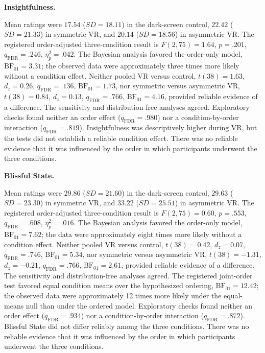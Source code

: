 \documentclass[pdflatex,sn-basic,lineno]{../sn-jnl}
\begin{document}
\medskip\noindent\textbf{Insightfulness.}\nopagebreak[4]

Mean ratings were $17.54$ ($SD=18.11$) in the dark-screen control, $22.42$ ($SD=21.33$) in symmetric VR, and $20.14$ ($SD=18.56$) in asymmetric VR. The registered order-adjusted three-condition result is $F(2,75)=1.64$, $p=.201$, $q_{\mathrm{FDR}}=.246$, $\eta_p^2=.042$. The Bayesian analysis favored the order-only model, $\mathrm{BF}_{01}=3.31$; the observed data were approximately three times more likely without a condition effect. Neither pooled VR versus control, $t(38)=1.63$, $d_z=0.26$, $q_{\mathrm{FDR}}=.136$, $\mathrm{BF}_{01}=1.73$, nor symmetric versus asymmetric VR, $t(38)=0.84$, $d_z=0.13$, $q_{\mathrm{FDR}}=.766$, $\mathrm{BF}_{01}=4.16$, provided reliable evidence of a difference. The sensitivity and distribution-free analyses agreed. Exploratory checks found neither an order effect ($q_{\mathrm{FDR}}=.980$) nor a condition-by-order interaction ($q_{\mathrm{FDR}}=.819$). Insightfulness was descriptively higher during VR, but the tests did not establish a reliable condition effect. There was no reliable evidence that it was influenced by the order in which participants underwent the three conditions.

\medskip\noindent\textbf{Blissful State.}\nopagebreak[4]

Mean ratings were $29.86$ ($SD=21.60$) in the dark-screen control, $29.63$ ($SD=23.30$) in symmetric VR, and $33.22$ ($SD=25.51$) in asymmetric VR. The registered order-adjusted three-condition result is $F(2,75)=0.60$, $p=.553$, $q_{\mathrm{FDR}}=.608$, $\eta_p^2=.016$. The Bayesian analysis favored the order-only model, $\mathrm{BF}_{01}=7.62$; the data were approximately eight times more likely without a condition effect. Neither pooled VR versus control, $t(38)=0.42$, $d_z=0.07$, $q_{\mathrm{FDR}}=.746$, $\mathrm{BF}_{01}=5.34$, nor symmetric versus asymmetric VR, $t(38)=-1.31$, $d_z=-0.21$, $q_{\mathrm{FDR}}=.766$, $\mathrm{BF}_{01}=2.61$, provided reliable evidence of a difference. The sensitivity and distribution-free analyses agreed. The registered joint-order test favored equal condition means over the hypothesized ordering, $\mathrm{BF}_{01}=12.42$; the observed data were approximately 12 times more likely under the equal-means null than under the ordered model. Exploratory checks found neither an order effect ($q_{\mathrm{FDR}}=.934$) nor a condition-by-order interaction ($q_{\mathrm{FDR}}=.872$). Blissful State did not differ reliably among the three conditions. There was no reliable evidence that it was influenced by the order in which participants underwent the three conditions.
\end{document}
